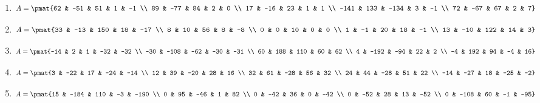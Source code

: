 \begin{enumerate}
\item

\begin{align*}
A = \pmat{62 & -51 & 51 & 1 & -1 \\ 89 & -77 & 84 & 2 & 0 \\ 17 & -16 & 23 & 1 & 1 \\ -141 & 133 & -134 & 3 & -1 \\ 72 & -67 & 67 & 2 & 7}
\end{align*}

\item

\begin{align*}
A = \pmat{33 & -13 & 150 & 18 & -17 \\ 8 & 10 & 56 & 8 & -8 \\ 0 & 0 & 10 & 0 & 0 \\ 1 & -1 & 20 & 18 & -1 \\ 13 & -10 & 122 & 14 & 3}
\end{align*}

\item

\begin{align*}
A = \pmat{-14 & 2 & 1 & -32 & -32 \\ -30 & -108 & -62 & -30 & -31 \\ 60 & 188 & 110 & 60 & 62 \\ 4 & -192 & -94 & 22 & 2 \\ -4 & 192 & 94 & -4 & 16}
\end{align*}

\item

\begin{align*}
A = \pmat{3 & -22 & 17 & -24 & -14 \\ 12 & 39 & -20 & 28 & 16 \\ 32 & 61 & -28 & 56 & 32 \\ 24 & 44 & -28 & 51 & 22 \\ -14 & -27 & 18 & -25 & -2}
\end{align*}

\item

\begin{align*}
A = \pmat{15 & -184 & 110 & -3 & -190 \\ 0 & 95 & -46 & 1 & 82 \\ 0 & -42 & 36 & 0 & -42 \\ 0 & -52 & 28 & 13 & -52 \\ 0 & -108 & 60 & -1 & -95}
\end{align*}


\end{enumerate}
